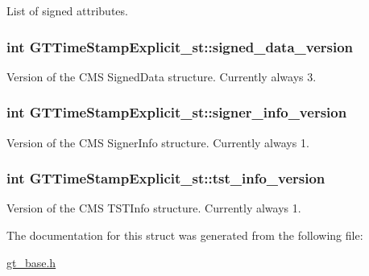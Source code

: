 \label{struct_g_t_time_stamp_explicit__st_aa0655469149117409308f6f4fb361c94}
List of signed attributes. \hypertarget{struct_g_t_time_stamp_explicit__st_a8ba3b09fd5244b24b57baa22381a794a}{
\subsubsection[{signed\_\-data\_\-version}]{\setlength{\rightskip}{0pt plus 5cm}int {\bf GTTimeStampExplicit\_\-st::signed\_\-data\_\-version}}}
\label{struct_g_t_time_stamp_explicit__st_a8ba3b09fd5244b24b57baa22381a794a}
Version of the CMS {\ttfamily SignedData} structure. Currently always 3. \hypertarget{struct_g_t_time_stamp_explicit__st_a2c8418adfe52de52a85f393448ec4fd2}{
\subsubsection[{signer\_\-info\_\-version}]{\setlength{\rightskip}{0pt plus 5cm}int {\bf GTTimeStampExplicit\_\-st::signer\_\-info\_\-version}}}
\label{struct_g_t_time_stamp_explicit__st_a2c8418adfe52de52a85f393448ec4fd2}
Version of the CMS {\ttfamily SignerInfo} structure. Currently always 1. \hypertarget{struct_g_t_time_stamp_explicit__st_ae5c2bd5eaa7753ba94c24c2327c9355f}{
\subsubsection[{tst\_\-info\_\-version}]{\setlength{\rightskip}{0pt plus 5cm}int {\bf GTTimeStampExplicit\_\-st::tst\_\-info\_\-version}}}
\label{struct_g_t_time_stamp_explicit__st_ae5c2bd5eaa7753ba94c24c2327c9355f}
Version of the CMS {\ttfamily TSTInfo} structure. Currently always 1. 

The documentation for this struct was generated from the following file:\begin{DoxyCompactItemize}
\item 
\hyperlink{gt__base_8h}{gt\_\-base.h}\end{DoxyCompactItemize}
